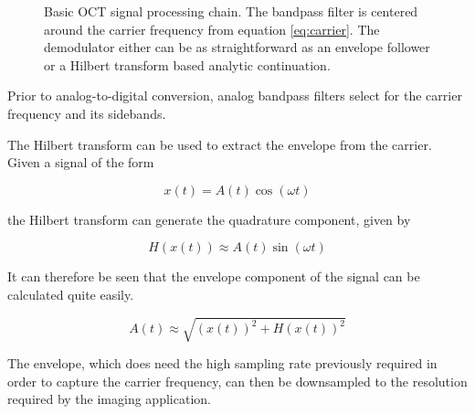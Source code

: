 \begin{figure}[h!]
  \centering
{}
\caption{Basic OCT signal processing chain. The bandpass filter is centered around the carrier frequency from equation \ref{eq:carrier}. The demodulator either can be as straightforward as an envelope follower or a Hilbert transform based analytic continuation.}
\end{figure}

Prior to analog-to-digital conversion, analog bandpass filters select for the carrier frequency and its sidebands.

The Hilbert transform can be used to extract the envelope from the carrier. Given a signal of the form

\begin{equation}
x(t) = A(t)\cos{(\omega t)}
\end{equation}

the Hilbert transform can generate the quadrature component, given by

\begin{equation}
H(x(t)) \approx A(t) \sin{(\omega t)}
\end{equation}

It can therefore be seen that the envelope component of the signal can be calculated quite easily.

\begin{equation}
A(t) \approx \sqrt{(x(t))^2 + H(x(t))^2}
\end{equation}

The envelope, which does need the high sampling rate previously required in order to capture the carrier frequency, can then be downsampled to the resolution required by the imaging application.

